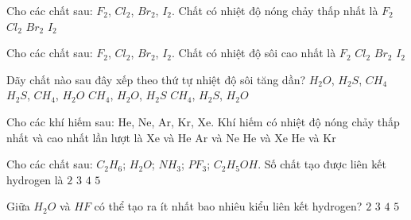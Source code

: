 \begin{ex}
	Cho các chất sau: $F_2$, $Cl_2$, $Br_2$, $I_2$.
	Chất có nhiệt độ nóng chảy thấp nhất là
	\choice
	{\True $F_2$}
	{$Cl_2$}
	{$Br_2$}
	{$I_2$}
	\loigiai{}
\end{ex}

\begin{ex}
	Cho các chất sau: $F_2$, $Cl_2$, $Br_2$, $I_2$.
	Chất có nhiệt độ sôi cao nhất là
	\choice
	{$F_2$}
	{$Cl_2$}
	{$Br_2$}
	{\True $I_2$}
	\loigiai{}
\end{ex}

\begin{ex}
	Dãy chất nào sau đây xếp theo thứ tự nhiệt độ sôi tăng dần?
	\choice
	{$H_2O$, $H_2S$, $CH_4$}
	{$H_2S$, $CH_4$, $H_2O$}
	{$CH_4$, $H_2O$, $H_2S$}
	{\True $CH_4$, $H_2S$, $H_2O$}
	\loigiai{}
\end{ex}

\begin{ex}
	Cho các khí hiếm sau: He, Ne, Ar, Kr, Xe.
	Khí hiếm có nhiệt độ nóng chảy thấp nhất và cao nhất lần lượt là
	\choice
	{Xe và He}
	{Ar và Ne}
	{\True He và Xe}
	{He và Kr}
	\loigiai{}
\end{ex}

\begin{ex}
	Cho các chất sau: $C_2H_6$; $H_2O$; $NH_3$; $PF_3$; $C_2H_5OH$.
	Số chất tạo được liên kết hydrogen là
	\choice
	{$2$}
	{\True $3$}
	{$4$}
	{$5$}
	\loigiai{}
\end{ex}

\begin{ex}
	Giữa $H_2O$ và $HF$ có thể tạo ra ít nhất bao nhiêu kiểu liên kết hydrogen?
	\choice
	{$2$}
	{$3$}
	{\True $4$}
	{$5$}
	\loigiai{}
\end{ex}

